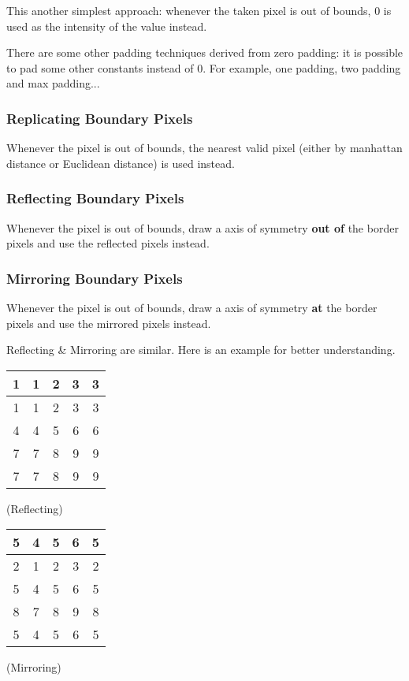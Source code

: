 \documentclass{note}
\begin{document}
This another simplest approach: whenever the taken pixel is out of bounds, $0$ is used as the intensity of the value instead.

\begin{tip}
    There are some other padding techniques derived from zero padding: it is possible to pad some other constants instead of $0$. For example, one padding, two padding and max padding... 
\end{tip}

\subsubsection{Replicating Boundary Pixels}

Whenever the pixel is out of bounds, the nearest valid pixel (either by manhattan distance or Euclidean distance) is used instead.

\subsubsection{Reflecting Boundary Pixels}

Whenever the pixel is out of bounds, draw a axis of symmetry \textbf{out of} the border pixels and use the reflected pixels instead.

\subsubsection{Mirroring Boundary Pixels}

Whenever the pixel is out of bounds, draw a axis of symmetry \textbf{at} the border pixels and use the mirrored pixels instead.

\begin{tip}
    Reflecting \& Mirroring are similar. Here is an example for better understanding.
    \begin{center}
        \begin{tabular}{c|ccc|c}
            1 & 1 & 2 & 3 & 3 \\\hline
            1 & 1 & 2 & 3 & 3 \\
            4 & 4 & 5 & 6 & 6 \\
            7 & 7 & 8 & 9 & 9 \\\hline
            7 & 7 & 8 & 9 & 9 \\
        \end{tabular}
        \small{(Reflecting)}
    \end{center}
    \begin{center}
        \begin{tabular}{c|ccc|c}
            5 & 4 & 5 & 6 & 5 \\\hline
            2 & 1 & 2 & 3 & 2 \\
            5 & 4 & 5 & 6 & 5 \\
            8 & 7 & 8 & 9 & 8 \\\hline
            5 & 4 & 5 & 6 & 5 \\
        \end{tabular}
        \small{(Mirroring)}
    \end{center}
\end{tip}
\end{document}
